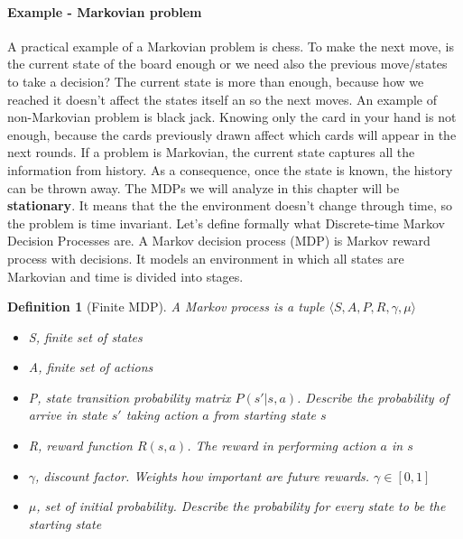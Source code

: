 \documentclass[main.tex]{subfiles}
\newtheorem{definition}{Definition}[section]
\begin{document}
\paragraph{Example - Markovian problem} A practical example of a Markovian problem is chess. To make the next move, is the current state of the board enough or we need also the previous move/states to take a decision? The current state is more than enough, because how we reached it doesn't affect the states itself an so the next moves. An example of non-Markovian problem is black jack. Knowing only the card in your hand is not enough, because the cards previously drawn affect which cards will appear in the next rounds.
\newline
\newline
If a problem is Markovian, the current state captures all the information from history. As a consequence, once the state is known, the history can be thrown away. The MDPs we will analyze in this chapter will be \textbf{stationary}\footnotemark. It means that the the environment doesn't change through time, so the problem is time invariant.
\newline
Let's define formally what Discrete-time Markov Decision Processes are.
A Markov decision process (MDP) is Markov reward process with decisions. It models an environment in which all states are Markovian and time is divided into stages.
\newpage
\begin{definition}[Finite MDP]
A Markov process is a tuple $\langle S, A, P, R, \gamma, \mu \rangle$
\begin{itemize}
    \item S, finite set of states
    \item A, finite set of actions
    \item P, state transition probability matrix $P(s'|s,a)$. Describe the probability of arrive in state $s'$ taking action $a$ from starting state $s$
    \item R, reward function $R(s,a)$. The reward in performing action $a$ in $s$ 
    \item $\gamma$, discount factor. Weights how important are future rewards. $\gamma \in [0,1]$
    \item $\mu$, set of initial probability. Describe the probability for every state to be the starting state
\end{itemize}
\end{definition}
\end{document}
